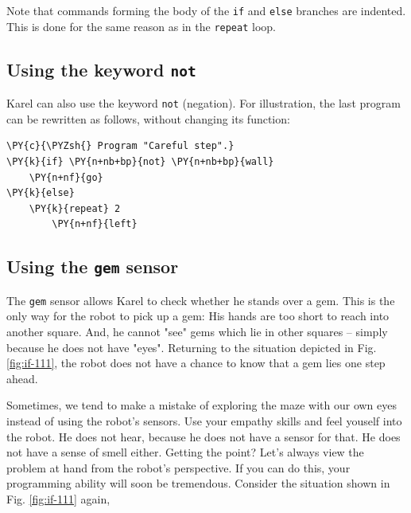 \begin{gbox}
\begin{center}
Note that commands forming the body of the {\tt if} and {\tt else} branches are indented.
This is done for the same reason as in the {\tt repeat} loop. 
\end{center}
\end{gbox}

\subsection{Using the keyword {\tt not}}

Karel can also use the keyword {\tt not} (negation). For illustration, the last 
program can be rewritten as follows, without changing its function:\\

\begin{bbox}
\begin{Verbatim}[commandchars=\\\{\}]
\PY{c}{\PYZsh{} Program "Careful step".}
\PY{k}{if} \PY{n+nb+bp}{not} \PY{n+nb+bp}{wall}
    \PY{n+nf}{go}
\PY{k}{else}
    \PY{k}{repeat} 2
        \PY{n+nf}{left}
\end{Verbatim}
\end{bbox}

\subsection{Using the {\tt gem} sensor}

The {\tt gem} sensor allows Karel to check whether he stands over a gem. 
This is the only way for the robot to pick up a gem: His hands are 
too short to reach into another square. And, he cannot "see" gems which 
lie in other squares -- simply because he does not have "eyes". Returning to 
the situation depicted in Fig. \ref{fig:if-111}, the robot does not have 
a chance to know that a gem lies one step ahead. 

Sometimes, we tend to make 
a mistake of exploring the maze with our own eyes instead of using the 
robot's sensors. Use your empathy skills and feel youself into the robot. 
He does not hear, because he does not have a sensor for that. He does not 
have a sense of smell either. Getting the point? Let's always view the 
problem at hand from the robot's perspective. If you can do this, your 
programming ability will soon be tremendous.
Consider the situation shown in Fig. \ref{fig:if-111} again,

